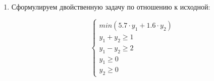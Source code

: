 \begin{enumerate}
\item Сформулируем двойственную задачу по отношению к исходной:

\begin{displaymath}
\begin{cases}
	min \left( 5.7 \cdot y_1 + 1.6 \cdot y_2 \right)
	\\
	y_1 + y_2 \geq 1
	\\
	y_1 - y_2 \geq 2
	\\
	y_1 \geq 0
	\\
	y_2 \geq 0
\end{cases}
\end{displaymath}

\end{enumerate}


